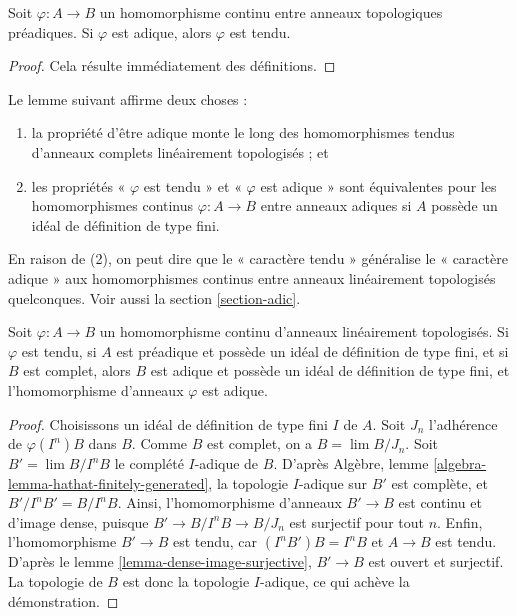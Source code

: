 \begin{lemma}
\label{lemma-adic-taut}
Soit $\varphi : A \to B$ un homomorphisme continu entre anneaux
topologiques préadiques. Si $\varphi$ est adique, alors $\varphi$ est tendu.
\end{lemma}

\begin{proof}
Cela résulte immédiatement des définitions.
\end{proof}

\noindent
Le lemme suivant affirme deux choses :
\begin{enumerate}
\item la propriété d'être adique monte le long des homomorphismes tendus
d'anneaux complets linéairement topologisés ; et
\item les propriétés « $\varphi$ est tendu » et « $\varphi$ est adique »
sont équivalentes pour les homomorphismes continus $\varphi : A \to B$ entre anneaux adiques
si $A$ possède un idéal de définition de type fini.
\end{enumerate}
En raison de (2), on peut dire que le « caractère tendu » généralise le « caractère adique »
aux homomorphismes continus entre anneaux linéairement topologisés quelconques.
Voir aussi la section \ref{section-adic}.

\begin{lemma}
\label{lemma-taut-is-adic}
Soit $\varphi : A \to B$ un homomorphisme continu d'anneaux linéairement topologisés.
Si $\varphi$ est tendu, si $A$ est préadique et possède un idéal de définition
de type fini, et si $B$ est complet, alors $B$ est adique et possède un idéal de définition
de type fini, et l'homomorphisme d'anneaux $\varphi$ est adique.
\end{lemma}

\begin{proof}
Choisissons un idéal de définition de type fini $I$ de $A$.
Soit $J_n$ l'adhérence de $\varphi(I^n)B$ dans $B$.
Comme $B$ est complet, on a $B = \lim B/J_n$.
Soit $B' = \lim B/I^nB$ le complété $I$-adique de $B$.
D'après Algèbre, lemme \ref{algebra-lemma-hathat-finitely-generated},
la topologie $I$-adique sur $B'$ est complète, et
$B'/I^nB' = B/I^nB$. Ainsi, l'homomorphisme d'anneaux $B' \to B$ est continu
et d'image dense, puisque $B' \to B/I^nB \to B/J_n$ est surjectif
pour tout $n$. Enfin, l'homomorphisme $B' \to B$ est tendu,
car $(I^nB')B = I^nB$ et $A \to B$ est tendu.
D'après le lemme \ref{lemma-dense-image-surjective}, $B' \to B$ est ouvert
et surjectif. La topologie de $B$ est donc la topologie $I$-adique,
ce qui achève la démonstration.
\end{proof}









